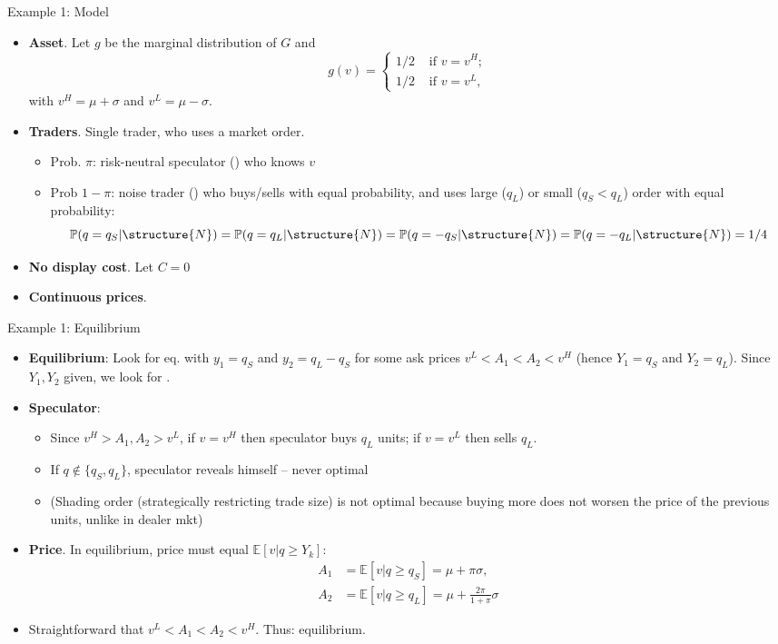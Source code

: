 \documentclass[english,10pt
,aspectratio=169
]{beamer}
\begin{document}
\begin{frame}{Example 1: Model} 
	\begin{itemize}
		\item \textbf{Asset}. Let $g$ be the marginal distribution of $G$ and
		\[
		g(v)=\left\{ \begin{aligned}
		1/2  & \text{ if } v=v^H; \\
		1/2 & \text{ if } v=v^L,
		\end{aligned}
		\right.
		\]
		with $v^{H}=\mu + \sigma $ and $v^{L}= \mu - \sigma $.
		\item \textbf{Traders}. Single trader, who uses a market order.
		\begin{itemize}
			\item Prob. $\pi$: risk-neutral speculator () who knows $v$
			\item Prob $1-\pi$: noise trader ()  who buys/sells with equal probability, and uses large ($q_L$) or small ($q_S<q_L$) order with equal probability:
			$$
			\mathbb{P}(q=q_S|\structure{N})= \mathbb{P}(q=q_L|\structure{N})=\mathbb{P}(q=-q_S|\structure{N})=\mathbb{P}(q=-q_L|\structure{N})=1/4
			$$
		\end{itemize}
		\item \textbf{No display cost}. Let $C=0$
		\item \textbf{Continuous prices}.
	\end{itemize}
\end{frame}


\begin{frame}{Example 1: Equilibrium}
	\begin{itemize}
		\item \textbf{Equilibrium}: Look for eq. with $y_{1}=q_{S}$ and $y_{2}=q_{L}-q_{S}$ for some ask prices $v^L<A_1<A_2<v^H$ (hence $Y_1=q_S$ and $Y_2=q_L$). Since $Y_1,Y_2$ given, we look for .
		\pause
		\item \textbf{Speculator}: 
		\begin{itemize}
			\item Since $v^H > A_1,A_2 > v^L$, if $v=v^{H}$ then speculator buys $q_{L}$ units; if $v=v^L$ then sells $q_L$. \only<2>{\alert{Why is this optimal?}}
			\pause
			\item If $q \notin \{q_S,q_L\}$, speculator reveals himself -- never optimal
			\item (Shading order (strategically restricting trade size) is not optimal because buying more does not worsen the price of the previous units, unlike in dealer mkt)
		\end{itemize}
		\pause 
		\item \textbf{Price}. In equilibrium, price must equal $\mathbb{E}[v|q\geq Y_k]$:
		\begin{align*}
			A_1 & =\mathbb{E}[v|q \geq q_{S}] = \mu + \pi \sigma,
			\\
			A_2 & = \mathbb{E}[v|q \geq q_{L}] = \mu + \frac{2\pi}{1+\pi} \sigma
		\end{align*}
		\item Straightforward that $v^L<A_1<A_2<v^H$. Thus: equilibrium.
	\end{itemize}
\end{frame}
\end{document}
